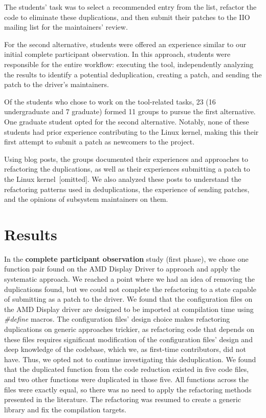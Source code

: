 \documentclass[10pt,conference]{IEEEtran}
\begin{document}
The students' task was to select a recommended entry from the list, refactor the code to eliminate these duplications, and then submit their patches to the IIO mailing list for the maintainers' review.

For the second alternative, students were offered an experience similar to our initial complete participant observation. In this approach, students were responsible for the entire workflow: executing the tool, independently analyzing the results to identify a potential deduplication, creating a patch, and sending the patch to the driver's maintainers.

Of the students who chose to work on the tool-related tasks, 23 (16 undergraduate and 7 graduate) formed 11 groups to pursue the first alternative. One graduate student opted for the second alternative. Notably, none of these students had prior experience contributing to the Linux kernel, making this their first attempt to submit a patch as newcomers to the project.

Using blog posts, the groups documented their experiences and approaches to refactoring the duplications, as well as their experiences submitting a patch to the Linux kernel~[omitted]. We also analyzed these posts to understand the refactoring patterns used in deduplications, the experience of sending patches, and the opinions of subsystem maintainers on them.

\section{Results}

In the \textbf{complete participant observation} study (first phase), we chose one function pair found on the AMD Display Driver to approach and apply the systematic approach.
%
We reached a point where we had an idea of removing the duplications found, but we could not complete the refactoring to a state capable of submitting as a patch to the driver. We found that the configuration files on the AMD Display driver are designed to be imported at compilation time using \textit{\#define} macros. The configuration files' design choice makes refactoring duplications on generic approaches trickier, as refactoring code that depends on these files requires significant modification of the configuration files' design and deep knowledge of the codebase, which we, as first-time contributors, did not have. Thus, we opted not to continue investigating this deduplication. We found that the duplicated function from the code reduction existed in five code files, and two other functions were duplicated in those five. All functions across the files were exactly equal, so there was no need to apply the refactoring methods presented in the literature. The refactoring was resumed to create a generic library and fix the compilation targets.
\end{document}

